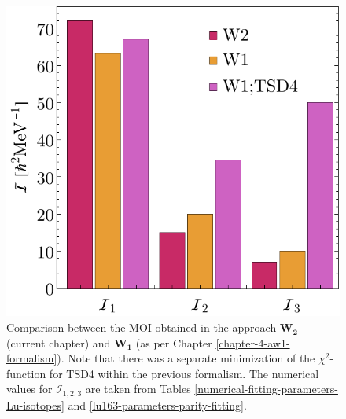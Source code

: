 \begin{figure}
    \centering
    \includegraphics[scale=0.75]{Chapters/Figures/parity-partners-plots/W1-W2-Mois.pdf}
    \caption{Comparison between the MOI obtained in the approach $\mathbf{W_2}$ (current chapter) and $\mathbf{W_1}$ (as per Chapter \ref{chapter-4-aw1-formalism}). Note that there was a separate minimization of the $\chi^2$-function for TSD4 within the previous formalism. The numerical values for $\mathcal{I}_{1,2,3}$ are taken from Tables \ref{numerical-fitting-parameters-Lu-isotopes} and \ref{lu163-parameters-parity-fitting}.}
    \label{moi-comparison-w1-w2-formalisms}
\end{figure}

